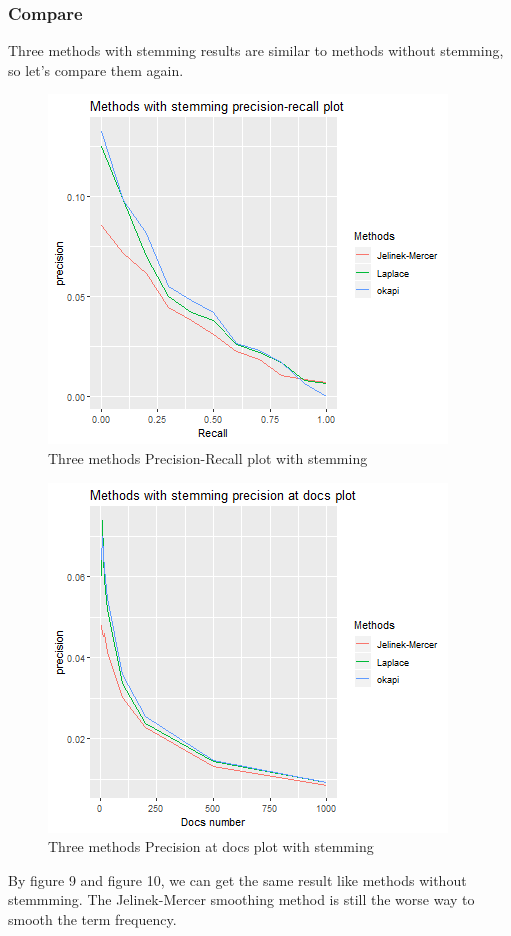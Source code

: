 \documentclass[a4pper,11pt,onecolumn]{article}
\begin{document}
\subsubsection{Compare}
Three methods with stemming results are similar to methods without stemming, so let's compare them again.
\begin{figure}[H]
\caption{Three methods Precision-Recall plot with stemming}
\includegraphics[scale = 0.6]{stemming_pr.png}
\centering
\end{figure}

\begin{figure}[H]
\caption{Three methods Precision at docs plot with stemming}
\includegraphics[scale = 0.6]{stemming_doc.png}
\centering
\end{figure}
By figure 9 and figure 10, we can get the same result like methods without stemmming. The Jelinek-Mercer smoothing method is still the worse way to smooth the term frequency.
\end{document}
